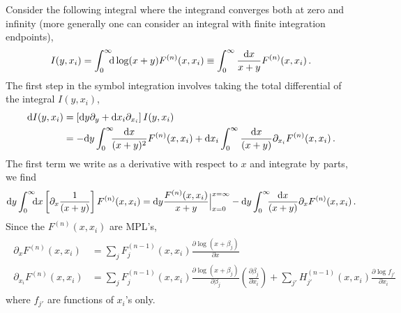 \documentclass[12pt]{article}
\begin{document}
Consider the following integral where the integrand converges both at zero and infinity (more generally one can consider an integral with finite integration endpoints),
\begin{align}
 I(y,x_i) = \int_0^\infty\!\!\! \mathrm{d} \log (x+y) F^{(n)}(x,x_i) \equiv  \int_0^\infty \frac{\mathrm{d} x}{x+y} F^{(n)}(x,x_i) \,.
\end{align}
The first step in the symbol integration involves taking the total differential of the integral $I(y,x_i)$,
\begin{align}
 \mathrm{d} I(y,x_i) &= \left[\mathrm{d} y \partial_y + \mathrm{d} x_i \partial_{x_i}\right] I(y,x_i) \nonumber \\
              &= - \mathrm{d} y \int_0^\infty \!\!\! \frac{\mathrm{d} x}{(x+y)^2} F^{(n)}(x,x_i) + \mathrm{d} x_i \int_0^\infty \frac{\mathrm{d} x}{(x+y)} \partial_{x_i}F^{(n)}(x,x_i)\,.
\end{align}
The first term we write as a derivative with respect to $x$ and integrate by parts, we find
\begin{align}
 \mathrm{d} y \int_0^\infty\!\!\!  \mathrm{d} x \left[\partial_x\frac{1}{(x+y)}\right] F^{(n)}(x,x_i) 
  =  \mathrm{d} y \frac{F^{(n)}(x,x_i)}{x+y}\Big|^{x=\infty}_{x=0}
 		   - \mathrm{d} y \int_0^\infty\!\!\!  \frac{\mathrm{d} x}{(x+y)} \partial_xF^{(n)}(x,x_i) \,.
\end{align}
Since the $F^{(n)}(x,x_i)$ are MPL's,
\begin{align}
\begin{split}
\partial_x      F^{(n)}(x,x_i) &\!=\! \sum_{j} F^{(n-1)}_j(x,x_i) \frac{\partial\log(x+\beta_j)}{\partial x } \\
\partial_{x_i} F^{(n)}(x,x_i) &\!=\! \sum_{j} F^{(n-1)}_j(x,x_i) \frac{\partial\log(x+\beta_j)}{\partial \beta_j}  \left(\frac{\partial \beta_j}{\partial x_i} \right) 
					 \! +\! \sum_{j'} H^{(n-1)}_{j'} (x,x_i) \frac{\partial \log f_{j'}}{\partial x_i}
\end{split}
\end{align}
where $f_{j'}$ are functions of $x_{i}$'s only. 
\end{document}
